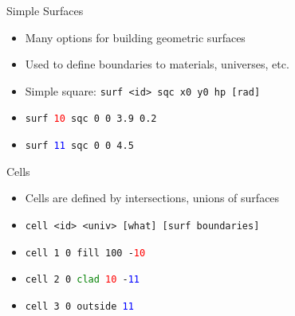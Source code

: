 \documentclass{beamer}
\begin{document}
\begin{frame}{Simple Surfaces}
    \begin{itemize}
        \item{Many options for building geometric surfaces}
        \item{Used to define boundaries to materials, universes, etc.}
        \item{Simple square: \texttt{surf <id> sqc x0 y0 hp [rad]}}
        \item{\texttt{surf \textcolor{red}{10} sqc 0 0 3.9 0.2}}
        \item{\texttt{surf \textcolor{blue}{11} sqc 0 0 4.5}}
    \end{itemize}
    \begin{figure}
        \centering
    \end{figure}
\end{frame}

\begin{frame}{Cells}
    \begin{itemize}
        \item{Cells are defined by intersections, unions of surfaces}
        \item{\texttt{cell <id> <univ> [what] [surf boundaries]}}
        \item{\texttt{cell 1 0 fill 100 -\textcolor{red}{10}}}
        \item{\texttt{cell 2 0 \textcolor{green}{clad} \textcolor{red}{10} -\textcolor{blue}{11}}}
        \item{\texttt{cell 3 0 outside \textcolor{blue}{11}}}
    \end{itemize}
    \begin{figure}
        \centering
    \end{figure}
\end{frame}
\end{document}
